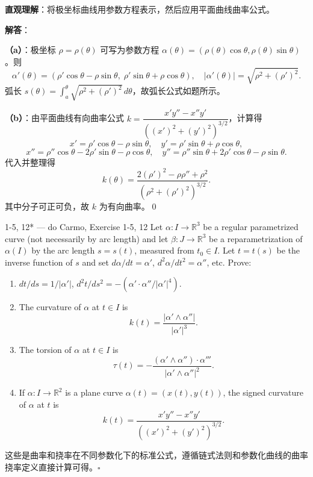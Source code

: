 \begin{solution}
\textbf{直观理解}：将极坐标曲线用参数方程表示，然后应用平面曲线曲率公式。

\textbf{解答}：

\textbf{（a）}：极坐标 $\rho = \rho(\theta)$ 可写为参数方程 $\alpha(\theta) = (\rho(\theta)\cos\theta, \rho(\theta)\sin\theta)$。则
\[
\alpha'(\theta) = (\rho'\cos\theta - \rho\sin\theta,\; \rho'\sin\theta + \rho\cos\theta),\quad |\alpha'(\theta)| = \sqrt{\rho^2 + (\rho')^2}.
\]
弧长 $s(\theta) = \int_a^\theta \sqrt{\rho^2 + (\rho')^2}\, d\theta$，故弧长公式如题所示。

\textbf{（b）}：由平面曲线有向曲率公式 $k = \dfrac{x'y''-x''y'}{((x')^2+(y')^2)^{3/2}}$，计算得
\[
x' = \rho'\cos\theta - \rho\sin\theta,\quad y' = \rho'\sin\theta + \rho\cos\theta,
\]
\[
x'' = \rho''\cos\theta - 2\rho'\sin\theta - \rho\cos\theta,\quad y'' = \rho''\sin\theta + 2\rho'\cos\theta - \rho\sin\theta.
\]
代入并整理得
\[
k(\theta) = \frac{2(\rho')^2 - \rho\rho'' + \rho^2}{(\rho^2 + (\rho')^2)^{3/2}}.
\]
其中分子可正可负，故 $k$ 为有向曲率。\qed
\end{solution}


\begin{exercise}{1-5, 12* — do Carmo, Exercise 1-5, 12}
Let $\alpha: I \to \mathbb{R}^3$ be a regular parametrized curve (not necessarily by arc length) and let $\beta: J \to \mathbb{R}^3$ be a reparametrization of $\alpha(I)$ by the arc length $s = s(t)$, measured from $t_0 \in I$. Let $t = t(s)$ be the inverse function of $s$ and set $d\alpha/dt = \alpha'$, $d^2\alpha/dt^2 = \alpha''$, etc. Prove:
\begin{enumerate}
\item[a.] $dt/ds = 1/|\alpha'|$, $d^2t/ds^2 = -(\alpha' \cdot \alpha'' / |\alpha'|^4)$.
\item[b.] The curvature of $\alpha$ at $t \in I$ is
\[
k(t) = \frac{|\alpha' \wedge \alpha''|}{|\alpha'|^3}.
\]
\item[c.] The torsion of $\alpha$ at $t \in I$ is
\[
\tau(t) = - \frac{(\alpha' \wedge \alpha'') \cdot \alpha'''}{|\alpha' \wedge \alpha''|^2}.
\]
\item[d.] If $\alpha: I \to \mathbb{R}^2$ is a plane curve $\alpha(t) = (x(t), y(t))$, the signed curvature of $\alpha$ at $t$ is
\[
k(t) = \frac{x'y'' - x''y'}{((x')^2 + (y')^2)^{3/2}}.
\]
\end{enumerate}
\end{exercise}

\begin{solution}
这些是曲率和挠率在不同参数化下的标准公式，遵循链式法则和参数化曲线的曲率挠率定义直接计算可得。$\square$
\end{solution}


